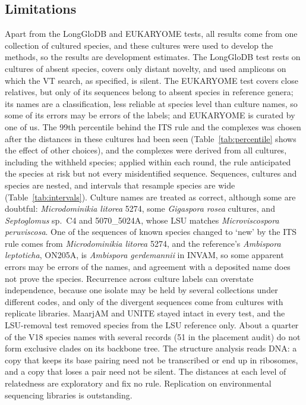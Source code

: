 \documentclass[11pt]{article}
\newcommand{\spn}[1]{\emph{#1}}   %
\begin{document}
\subsection{Limitations}
Apart from the LongGloDB and EUKARYOME tests, all results come from one collection of cultured species, and these
cultures were used to develop the methods, so the results are development estimates. The LongGloDB test rests on
\LgNovelCultures{} cultures of absent species, covers only distant novelty, and used amplicons on which the VT
search, as specified, is silent. The EUKARYOME test covers close relatives, but only \EkNovelSpN{} of its sequences
belong to absent species in reference genera; its names are a classification, less reliable at species level than
culture names, so some of its errors may be errors of the labels; and EUKARYOME is curated by one of us. The 99th percentile behind the ITS rule and the complexes was chosen after the distances in these cultures had
been seen (Table~\ref{tab:percentile} shows the effect of other choices), and the complexes were derived from all
cultures, including the withheld species; applied within each round, the rule anticipated the species at risk but not
every misidentified sequence. Sequences, cultures and species are nested, and intervals that resample species are wide
(Table~\ref{tab:intervals}). Culture names are treated as correct, although some are doubtful:
\spn{Microdominikia litorea} 5274, some \spn{Gigaspora rosea} cultures, and \spn{Septoglomus} sp.\ C4 and
5070\_5024A, whose LSU matches \spn{Microviscospora peruviscosa}. One of the \ITSDemotedKnown{} sequences of known
species changed to `new' by the ITS rule comes from \spn{Microdominikia litorea} 5274, and the reference's
\spn{Ambispora leptoticha}, ON205A, is \spn{Ambispora gerdemannii} in INVAM, so some apparent errors may be errors of
the names, and agreement with a deposited name does not prove the species. Recurrence across culture labels can
overstate independence, because one isolate may be held by several collections under different codes, and only
\ClAllLibrepTested{} of the \ClAllCopies{} divergent sequences come from cultures with replicate libraries. MaarjAM and
UNITE stayed intact in every test, and the LSU-removal test removed species from the LSU reference only. About a
quarter of the V18 species names with several records (51 in the placement audit) do not form exclusive clades on its
backbone tree. The structure analysis reads DNA: a copy that keeps its base pairing need not be transcribed or end up
in ribosomes, and a copy that loses a pair need not be silent. The distances at each level of relatedness are
exploratory and fix no rule. Replication on environmental sequencing libraries is outstanding.
\end{document}
